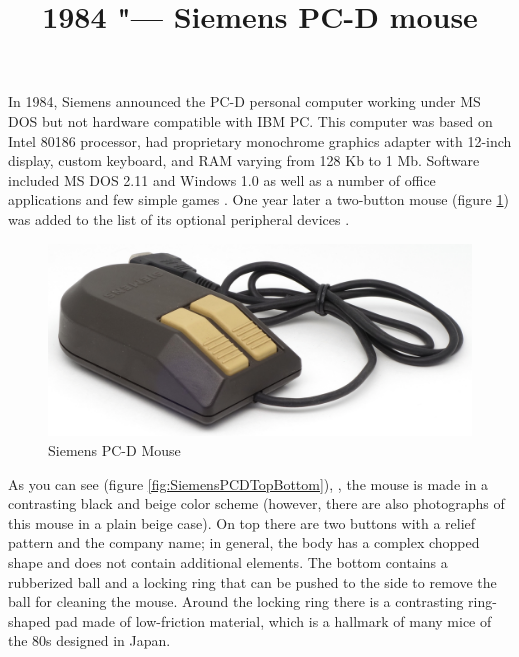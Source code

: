 \documentclass[11pt, a4paper]{article}
\begin{document}
\title{1984 "--- Siemens PC-D mouse}
\date{}
\maketitle
{}
In 1984, Siemens announced the PC-D personal computer working under MS DOS but not hardware compatible with IBM PC. This computer was based on Intel 80186 processor, had proprietary monochrome graphics adapter with 12-inch display, custom keyboard, and RAM varying from 128 Kb to 1 Mb. Software included MS DOS 2.11 and Windows 1.0 as well as a number of office applications and few simple games \cite{wiki}. One year later a two-button mouse (figure \ref{fig:SiemensPCDPic}) was added to the list of its optional peripheral devices \cite{blog}.

\begin{figure}[h]
    \centering
    \includegraphics[scale=0.65]{1985_siemens_pcd_mouse/pic_30.jpg}
    \caption{Siemens PC-D Mouse}
    \label{fig:SiemensPCDPic}
\end{figure}

As you can see (figure \ref{fig:SiemensPCDTopBottom}), , the mouse is made in a contrasting black and beige color scheme (however, there are also photographs of this mouse in a plain beige case). On top there are two buttons with a relief pattern and the company name; in general, the body has a complex chopped shape and does not contain additional elements. The bottom contains a rubberized ball and a locking ring that can be pushed to the side to remove the ball for cleaning the mouse. Around the locking ring there is a contrasting ring-shaped pad made of low-friction material, which is a hallmark of many mice of the 80s designed in Japan.
\end{document}
